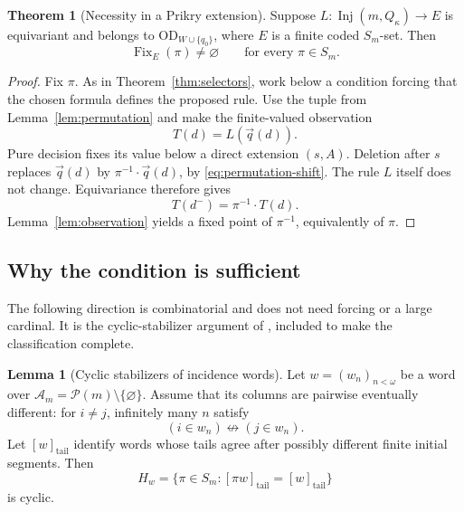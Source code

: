 \documentclass[11pt,letterpaper]{article}
\theoremstyle{definition}
\newtheorem{theorem}[definition]{Theorem}
\newtheorem{lemma}[definition]{Lemma}
\numberwithin{equation}{section}
\newcommand{\OD}{\mathrm{OD}}
\newcommand{\Pow}{\mathcal P}
\newcommand{\Inj}{\operatorname{Inj}}
\newcommand{\Fix}{\operatorname{Fix}}
\begin{document}
\begin{theorem}[Necessity in a Prikry extension]\label{thm:label-necessity}
Suppose $L:\Inj(m,Q_\kappa)\to E$ is equivariant and belongs to $\OD_{W\cup\{q_0\}}$, where $E$ is a finite coded $S_m$-set. Then
\[
 \Fix_E(\pi)\ne\varnothing\qquad\text{for every }\pi\in S_m.
 \label{eq:elementwisefix}\tag{6}
\]
\end{theorem}

\begin{proof}
Fix $\pi$. As in Theorem~\ref{thm:selectors}, work below a condition forcing that the chosen formula defines the proposed rule. Use the tuple from Lemma~\ref{lem:permutation} and make the finite-valued observation
\[
 T(d)=L(\vec q(d)).
\]
Pure decision fixes its value below a direct extension $(s,A)$. Deletion after $s$ replaces $\vec q(d)$ by $\pi^{-1}\cdot\vec q(d)$, by \eqref{eq:permutation-shift}. The rule $L$ itself does not change. Equivariance therefore gives
\[
 T(d^-)=\pi^{-1}\cdot T(d).
\]
Lemma~\ref{lem:observation} yields a fixed point of $\pi^{-1}$, equivalently of $\pi$.
\end{proof}

\subsection{Why the condition is sufficient}

The following direction is combinatorial and does not need forcing or a large cardinal. It is the cyclic-stabilizer argument of \cite[\S12.5]{synthesis}, included to make the classification complete.

\begin{lemma}[Cyclic stabilizers of incidence words]\label{lem:stabilizer}
Let $w=(w_n)_{n<\omega}$ be a word over
$\mathcal A_m=\Pow(m)\setminus\{\varnothing\}$. Assume that its columns are pairwise eventually different: for $i\ne j$, infinitely many $n$ satisfy
\[
 (i\in w_n)\not\leftrightarrow(j\in w_n).
\]
Let $[w]_{\mathrm{tail}}$ identify words whose tails agree after possibly different finite initial segments. Then
\[
 H_w=\{\pi\in S_m:[\pi w]_{\mathrm{tail}}=[w]_{\mathrm{tail}}\}
\]
is cyclic.
\end{lemma}
\end{document}
